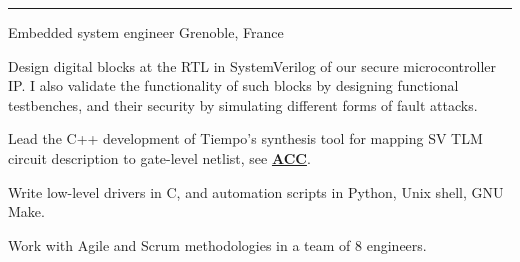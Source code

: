 \vspace{+2mm}\vspace{-3mm}
\rule{\textwidth}{0.5pt}\vspace{-1mm}

\begin{cventries}
\vspace{-5mm}

\cventry
{}
{\vspace{-9mm}Embedded system engineer } %
{\vspace{-9mm}\normalcolor Grenoble, France} %
{} %
{
\begin{cvitems}
\iffalse
\item{Design secure digital architectures in SystemVerilog via 
Communicating Sequential Processes --~hardware blocks are described as sets of 
concurrent processes that communicate via IPC, i.e.~shared memory and message 
passing via channels.}
\fi
\item{Design digital blocks at the RTL in SystemVerilog of our secure 
microcontroller IP. I also validate the functionality of such blocks by 
designing functional testbenches, and their security by simulating different 
forms of fault attacks.}
\item{Lead the C++ development of Tiempo's synthesis tool for mapping SV TLM 
circuit description to gate-level netlist, see 
{\color{myblue}\href{http://www.tiempo-ic.com/uploads/Docs/ACC_Datasheet.pdf}{\textbf{ACC}}}.}
\item{Write low-level drivers in C, and automation scripts in Python, 
Unix shell, GNU Make.}
\item{Work with Agile and Scrum methodologies in a team of 8 engineers.}
\end{cvitems}
}
\vspace{-5mm}


\end{cventries}
